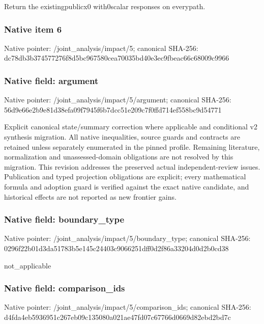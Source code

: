 \documentclass[10pt,a4paper]{article}
\begin{document}
\begingroup\raggedright\sloppy Return the existingpublicx0 with0scalar responses on everypath.\par\endgroup

\subsubsection{Native item 6}
Native pointer: /joint\_\allowbreak{}analysis/impact/5; canonical SHA-256: dc78db3b374577276f8d5bc967580cea70035bd40e3ec9fbeac66c68009c9966

\subsubsection{Native field: argument}
Native pointer: /joint\_\allowbreak{}analysis/impact/5/argument; canonical SHA-256: 56d9e66e2b9e81d38efa09f7945f6b7dcc51e209c7f0ffd714ef558bc9d54771

\begingroup\raggedright\sloppy Explicit canonical state/\allowbreak{}summary correction where applicable and conditional v2 synthesis migration. All native inequalities,\allowbreak{} source guards and contracts are retained unless separately enumerated in the pinned profile. Remaining literature,\allowbreak{} normalization and unassessed-domain obligations are not resolved by this migration. This revision addresses the preserved actual independent-review issues. Publication and typed projection obligations are explicit;\allowbreak{} every mathematical formula and adoption guard is verified against the exact native candidate,\allowbreak{} and historical effects are not reported as new frontier gains.\par\endgroup

\subsubsection{Native field: boundary\_\allowbreak{}type}
Native pointer: /joint\_\allowbreak{}analysis/impact/5/boundary\_\allowbreak{}type; canonical SHA-256: 0296f22b01d3da51783b5e145c24403c9066251dff0d2f86a33204d0d2b0cd38

\begingroup\raggedright\sloppy not\_\allowbreak{}applicable\par\endgroup

\subsubsection{Native field: comparison\_\allowbreak{}ids}
Native pointer: /joint\_\allowbreak{}analysis/impact/5/comparison\_\allowbreak{}ids; canonical SHA-256: d4fda4eb5936951c267eb09c135080a021ae47fd07c67766d0669d82ebd2bd7c
\end{document}
